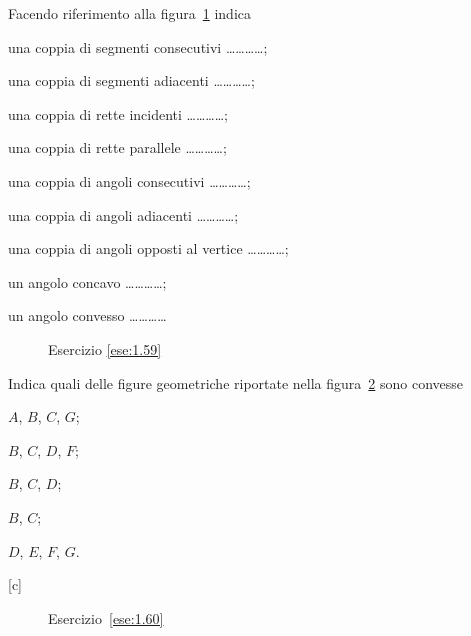 \begin{esercizio}
\label{ese:1.59}
Facendo riferimento alla figura~\ref{fig:ese1.59} indica
\begin{enumeratea}
\item una coppia di segmenti consecutivi \ldots\ldots\ldots\ldots{};
\item una coppia di segmenti adiacenti \ldots\ldots\ldots\ldots{};
\item una coppia di rette incidenti \ldots\ldots\ldots\ldots{};
\item una coppia di rette parallele \ldots\ldots\ldots\ldots{};
\item una coppia di angoli consecutivi \ldots\ldots\ldots\ldots{};
\item una coppia di angoli adiacenti \ldots\ldots\ldots\ldots{};
\item una coppia di angoli opposti al vertice 
\ldots\ldots\ldots\ldots{};
\item un angolo concavo \ldots\ldots\ldots\ldots{};
\item un angolo convesso \ldots\ldots\ldots\ldots{}
\end{enumeratea}
\end{esercizio}


\begin{inaccessibleblock}
 \begin{figure}[htb]
 \centering
 \caption{Esercizio \ref{ese:1.59}}\label{fig:ese1.59}
\end{figure}
\end{inaccessibleblock}

\begin{esercizio}
\label{ese:1.60}
Indica quali delle figure geometriche riportate nella 
figura~\ref{fig:ese1.60} sono convesse
\begin{multicols}{5}
\begin{enumeratea}
\item $A$, $B$, $C$, $G$;
\item $B$, $C$, $D$, $F$;
\item $B$, $C$, $D$;
\item $B$, $C$;
\item $D$, $E$, $F$, $G$.
\end{enumeratea}
\end{multicols}
\hfill[c]
\end{esercizio}


\begin{inaccessibleblock}
 \begin{figure}[htb]
 \centering
 \caption{Esercizio~\ref{ese:1.60}}\label{fig:ese1.60}
\end{figure}
\end{inaccessibleblock}

